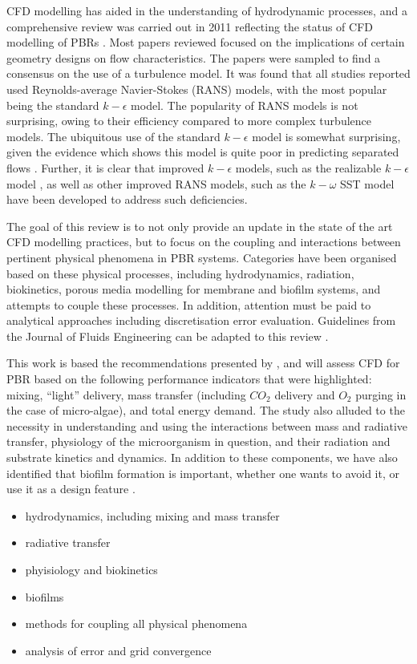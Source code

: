 CFD modelling has aided in the understanding of hydrodynamic processes, and a comprehensive review was carried out in 2011 reflecting the status of CFD modelling of PBRs \cite{bitog2011}. Most papers reviewed focused on the implications of certain geometry designs on flow characteristics. The papers were sampled to find a consensus on the use of a turbulence model. It was found that all studies reported used Reynolds-average Navier-Stokes (RANS) models, with the most popular being the standard $k-\epsilon$ model. The popularity of RANS models is not surprising, owing to their efficiency compared to more complex turbulence models.  The ubiquitous use of the standard $k-\epsilon$ model is somewhat surprising, given the evidence which shows this model is quite poor in predicting separated flows \cite{menter2003}. Further, it is clear that improved $k-\epsilon$ models, such as the realizable $k-\epsilon$ model \cite{shih1995}, as well as other improved RANS models, such as the $k-\omega$  SST model \cite{menter1994,menter2003} have been developed to address such deficiencies.
\skippingparagraph

The goal of this review is to not only provide an update in the state of the art CFD modelling practices, but to focus on the coupling and interactions between pertinent physical phenomena in PBR systems. Categories have been organised based on these physical processes, including hydrodynamics, radiation, biokinetics, porous media modelling for membrane and biofilm systems, and attempts to couple these processes. In addition, attention must be paid to analytical approaches including discretisation error evaluation. Guidelines from the Journal of Fluids Engineering can be adapted to this review \cite{celik2008}.
\skippingparagraph

This work is based the recommendations presented by \cite{posten2009}, and will assess CFD for PBR based on the following performance indicators that were highlighted: mixing, ``light'' delivery, mass transfer (including $CO_2$ delivery and $O_2$ purging in the case of micro-algae), and total energy demand. The study also alluded to the necessity in understanding and using the interactions between mass and radiative transfer, physiology of the microorganism in question, and their radiation and substrate kinetics and dynamics. In addition to these components, we have also identified that biofilm formation is important, whether one wants to avoid it, or use it as a design feature \cite{castro2017}.

\begin{itemize}
\item hydrodynamics, including mixing and mass transfer
\item radiative transfer
\item phyisiology and biokinetics
\item biofilms
\item methods for coupling all physical phenomena
\item analysis of error and grid convergence
\end{itemize}


